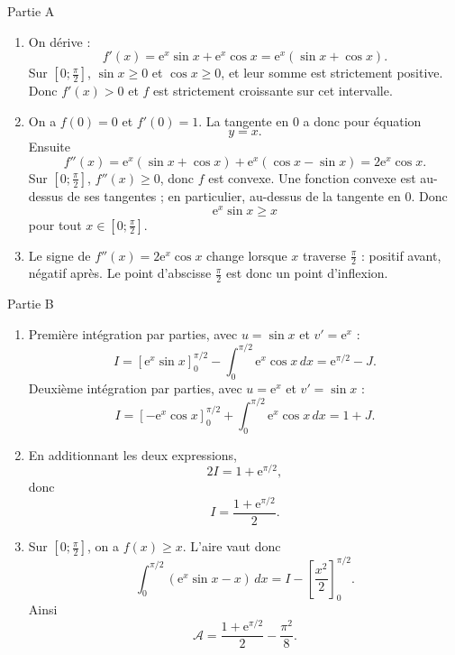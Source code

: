\documentclass[11pt,a4paper]{article}
\newcommand{\e}{\mathrm e}
\begin{document}
\begin{correctionbox}{Partie A}
\begin{enumerate}
\item On dérive :
\[
f'(x)=\e^x\sin x+\e^x\cos x=\e^x(\sin x+\cos x).
\]
Sur $\left[0;\frac\pi2\right]$, $\sin x\geqslant0$ et $\cos x\geqslant0$, et leur somme est strictement positive. Donc $f'(x)>0$ et $f$ est strictement croissante sur cet intervalle.

\item On a $f(0)=0$ et $f'(0)=1$. La tangente en $0$ a donc pour équation
\[
y=x.
\]
Ensuite
\[
f''(x)=\e^x(\sin x+\cos x)+\e^x(\cos x-\sin x)=2\e^x\cos x.
\]
Sur $\left[0;\frac\pi2\right]$, $f''(x)\geqslant0$, donc $f$ est convexe.
Une fonction convexe est au-dessus de ses tangentes ; en particulier, au-dessus de la tangente en $0$. Donc
\[
\e^x\sin x\geqslant x
\]
pour tout $x\in\left[0;\frac\pi2\right]$.

\item Le signe de $f''(x)=2\e^x\cos x$ change lorsque $x$ traverse $\frac\pi2$ : positif avant, négatif après. Le point d'abscisse $\frac\pi2$ est donc un point d'inflexion.
\end{enumerate}
\end{correctionbox}

\begin{correctionbox}{Partie B}
\begin{enumerate}
\item Première intégration par parties, avec $u=\sin x$ et $v'=\e^x$ :
\[
I=\left[\e^x\sin x\right]_0^{\pi/2}-\int_0^{\pi/2}\e^x\cos x\,dx
=\e^{\pi/2}-J.
\]
Deuxième intégration par parties, avec $u=\e^x$ et $v'=\sin x$ :
\[
I=\left[-\e^x\cos x\right]_0^{\pi/2}+\int_0^{\pi/2}\e^x\cos x\,dx
=1+J.
\]

\item En additionnant les deux expressions,
\[
2I=1+\e^{\pi/2},
\]
donc
\[
I=\dfrac{1+\e^{\pi/2}}2.
\]

\item Sur $\left[0;\frac\pi2\right]$, on a $f(x)\geqslant x$. L'aire vaut donc
\[
\int_0^{\pi/2}\left(\e^x\sin x-x\right)\,dx
=I-\left[\dfrac{x^2}{2}\right]_0^{\pi/2}.
\]
Ainsi
\[
\mathcal A=\dfrac{1+\e^{\pi/2}}2-\dfrac{\pi^2}{8}.
\]
\end{enumerate}
\end{correctionbox}

\newpage
\end{document}
